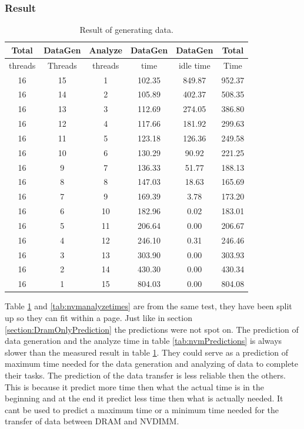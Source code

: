 \documentclass[12pt,a4paper,USenglish]{article}      %
\begin{document}
\subsubsection{Result}
\begin{table}[!hbtp]
\begin{tabular}{ |c|c|c|c|c|c| } 
\hline
Total & DataGen & Analyze & DataGen & DataGen & Total \\
\hline
threads & Threads & threads & time & idle time & Time \\
\hline
16 & 15 & 1 & 102.35 & 849.87 & 952.37 \\
\hline
16 & 14 & 2 & 105.89 & 402.37 & 508.35 \\
\hline
16 & 13 & 3 & 112.69 & 274.05 & 386.80 \\
\hline
16 & 12 & 4 & 117.66 & 181.92 & 299.63 \\
\hline
16 & 11 & 5 & 123.18 & 126.36 & 249.58 \\
\hline
16 & 10 & 6 & 130.29 & 90.92 & 221.25 \\
\hline
16 & 9 & 7 & 136.33 & 51.77 & 188.13 \\
\hline
16 & 8 & 8 & 147.03 & 18.63 & 165.69 \\
\hline
16 & 7 & 9 & 169.39 & 3.78 & 173.20 \\
\hline
16 & 6 & 10 & 182.96 & 0.02 & 183.01 \\
\hline
16 & 5 & 11 & 206.64 & 0.00 & 206.67 \\
\hline
16 & 4 & 12 & 246.10 & 0.31 & 246.46 \\
\hline
16 & 3 & 13 & 303.90 & 0.00 & 303.93 \\
\hline
16 & 2 & 14 & 430.30 & 0.00 & 430.34 \\
\hline
16 & 1 & 15 & 804.03 & 0.00 & 804.08 \\
\hline
\end{tabular}
\caption{Result of generating data.}
\label{tab:nvmDataGenerationTimes}
\end{table}

Table \ref{tab:nvmDataGenerationTimes} and \ref{tab:nvmanalyzetimes} are from the same test, they have been split up so they can fit within a page.
Just like in section \ref{section:DramOnlyPrediction} the predictions were not spot on. 
The prediction of data generation and the analyze time in table \ref{tab:nvmPredictions} is always slower than the measured result in table \ref{tab:nvmDataGenerationTimes}. They could serve as a prediction of maximum time needed for the data generation and analyzing of data to complete their tasks. The prediction of the data transfer is less reliable then the others. This is because it predict more time then what the actual time is in the beginning and at the end it predict less time then what is actually needed. It cant be used to predict a maximum time or a minimum time needed for the transfer of data between DRAM and NVDIMM.
\end{document}
